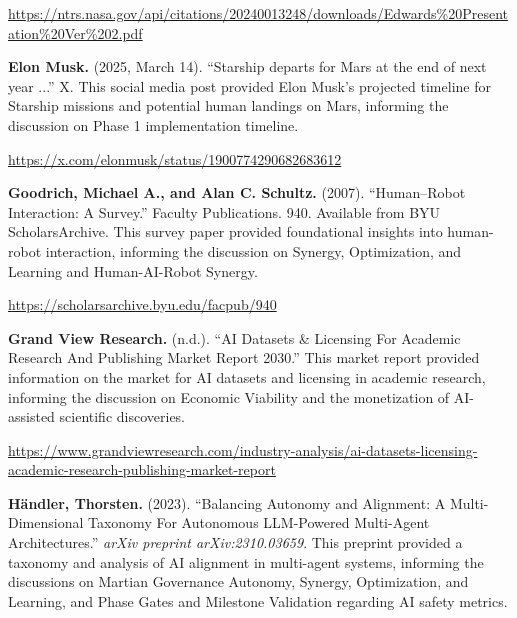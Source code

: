 \documentclass[fontsize=10pt, oneside, DIV=calc]{scrartcl}
\begin{document}
\href{https://ntrs.nasa.gov/api/citations/20240013248/downloads/Edwards\%20Presentation\_Ver\%202.pdf}{\url{https://ntrs.nasa.gov/api/citations/20240013248/downloads/Edwards\%20Presentation\%20Ver\%202.pdf}}

\vspace{1em}
\noindent \textbf{Elon Musk.} (2025, March 14). ``Starship departs for Mars at the end of next year ...'' X. This social media post provided Elon Musk's projected timeline for Starship missions and potential human landings on Mars, informing the discussion on Phase 1 implementation timeline. 



\href{https://x.com/elonmusk/status/1900774290682683612}{\url{https://x.com/elonmusk/status/1900774290682683612}}

\vspace{1em}
\noindent \textbf{Goodrich, Michael A., and Alan C. Schultz.} (2007). ``Human–Robot Interaction: A Survey.'' Faculty Publications. 940. Available from BYU ScholarsArchive. This survey paper provided foundational insights into human-robot interaction, informing the discussion on Synergy, Optimization, and Learning and Human-AI-Robot Synergy. 



\href{https://scholarsarchive.byu.edu/facpub/940}{\url{https://scholarsarchive.byu.edu/facpub/940}}

\vspace{1em}
\noindent \textbf{Grand View Research.} (n.d.). ``AI Datasets \& Licensing For Academic Research And Publishing Market Report 2030.'' This market report provided information on the market for AI datasets and licensing in academic research, informing the discussion on Economic Viability and the monetization of AI-assisted scientific discoveries. 



\href{https://www.grandviewresearch.com/industry-analysis/ai-datasets-licensing-academic-research-publishing-market-report}{\url{https://www.grandviewresearch.com/industry-analysis/ai-datasets-licensing-academic-research-publishing-market-report}}

\vspace{1em}
\noindent \textbf{Händler, Thorsten.} (2023). ``Balancing Autonomy and Alignment: A Multi-Dimensional Taxonomy For Autonomous LLM-Powered Multi-Agent Architectures.'' \textit{arXiv preprint arXiv:2310.03659}. This preprint provided a taxonomy and analysis of AI alignment in multi-agent systems, informing the discussions on Martian Governance Autonomy, Synergy, Optimization, and Learning, and Phase Gates and Milestone Validation regarding AI safety metrics. 
\end{document}
